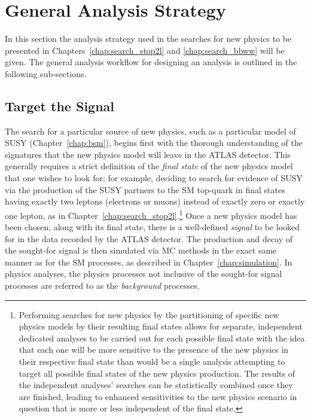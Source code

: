 \section{General Analysis Strategy}
\label{sec:gen_strategy}

In this section the analysis strategy used in the searches for new physics
to be presented in Chapters~\ref{chap:search_stop2l} and \ref{chap:search_bbww}
will be given.
The general analysis workflow for designing an analysis is outlined in the following
sub-sections.

\subsection{Target the Signal}
\label{sec:sig_pheno}

The search for a particular source of new physics, such as a particular model of SUSY (Chapter~\ref{chap:bsm}),
begins first with the thorough understanding of the signatures that the new physics model
will leave in the ATLAS detector.
This generally requires a strict definition of the \textit{final state} of the
new physics model that one wishes to look for; for example, deciding to search for
evidence of SUSY via the production of the SUSY partners to the SM top-quark
in final states having exactly two leptons (electrons or muons) instead of
exactly zero or exactly one lepton, as in Chapter~\ref{chap:search_stop2l}.\footnote{Performing
searches for new physics by the partitioning of specific new physics models
by their resulting final states allows for separate, independent dedicated analyses to be carried out
for each possible final state with the idea that each one will be more sensitive
to the presence of the new physics in their respective final state than would be
a single analysis attempting to target all possible final states of the new physics production.
The results of the independent analyses' searches can be statistically combined once they are finished,
leading to enhanced sensitivities to the new physics scenario in question that is more or less independent
of the final state.}
Once a new physics model has been chosen, along with its final state, there is a well-defined
\textit{signal} to be looked for in the data recorded by the ATLAS detector.
The production and decay of the sought-for signal is then simulated via MC methods in the exact
same manner as for the SM processes, as described in Chapter~\ref{chap:simulation}.
In physics analyses, the physics processes not inclusive of the sought-for signal processes
are referred to as the \textit{background} processes.

